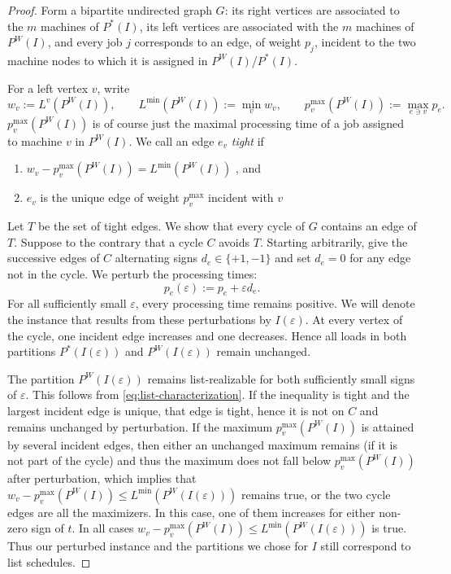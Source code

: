 \documentclass[%
english, titlepage=false %
]{./tum-templates/book/tumbook}
\begin{document}
\begin{proof}
\noindent
Form a bipartite undirected graph $G$: its right vertices are associated to
the $m$ machines of $P^{*}(I)$, its left vertices are associated with the $m$ machines of
$P^W(I)$, and every job $j$ corresponds to an edge, of weight $p_j$, incident to the two machine 
nodes to which it is assigned in $P^{W}(I)$/$P^{*}(I)$.


\noindent
For a left vertex $v$, write
\[
 w_v:=L^v(P^W(I)),
 \qquad L^{\min}(P^W(I)):=\min_v w_v,
 \qquad p^{\max}_v(P^W(I)):=\max_{e\ni v} p_e.
\]
$p^{\max}_v(P^W(I))$ is of course just the maximal processing time of a job assigned to machine $v$ in $P^{W}(I)$.
We call an edge $e_v$ \emph{tight} if
\begin{enumerate}
     \item $ w_v-p^{\max}_v(P^W(I))=L^{\min}(P^{W}(I))$ \label{eq:critical}, and 
     \item $e_v$ is the unique edge of weight $p^{\max}_v$ incident with $v$
\end{enumerate}


Let $T$ be the set of tight edges.
We show that every cycle of $G$ contains an edge of $T$.  Suppose to the
contrary that a cycle $C$ avoids $T$. Starting arbitrarily, give the successive edges of $C$
alternating signs $d_e\in\{+1,-1\}$ and set $d_e=0$ for any edge not in the cycle.
We perturb the processing times:
\[
 p_e(\varepsilon):=p_e+\varepsilon d_e.
\]
For all sufficiently small $\varepsilon$, every processing time remains
positive. We will denote the instance that results from these perturbations by
$I(\varepsilon)$. At every vertex of the cycle, one incident edge increases
and one decreases.  Hence all loads in both partitions $P^{*}(I(\varepsilon))$ and
$P^W(I(\varepsilon))$ remain unchanged.

The partition $P^W(I(\varepsilon))$ remains list-realizable for both sufficiently
small signs of $\varepsilon$.  This follows from
\eqref{eq:list-characterization}.
If the inequality is tight and the largest incident edge is unique,
that edge is tight, hence it is not on $C$ and remains
unchanged by perturbation. If the maximum $p^{\max}_v(P^W(I))$ is attained by several incident edges, then
either an unchanged maximum remains (if it is not part of the cycle) and thus the maximum does not
fall below $p^{\max}_v(P^W(I))$ after perturbation, which implies that $w_v-p^{\max}_v(P^W(I))\leq L^{\min}(P^{W}(I(\varepsilon)))$ remains true, or the two cycle edges are all the
maximizers. In this case, one of them increases for either non-zero
sign of $t$.  In all cases
$w_v-p^{\max}_v(P^W(I))\leq L^{\min}(P^{W}(I(\varepsilon)))$ is true. 
Thus our perturbed instance and the partitions we chose for $I$ still correspond to list schedules.


\end{proof}
\end{document}
